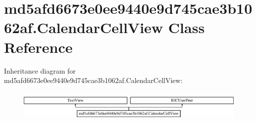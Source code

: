 \hypertarget{classmd5afd6673e0ee9440e9d745cae3b1062af_1_1CalendarCellView}{}\section{md5afd6673e0ee9440e9d745cae3b1062af.\+Calendar\+Cell\+View Class Reference}
\label{classmd5afd6673e0ee9440e9d745cae3b1062af_1_1CalendarCellView}
Inheritance diagram for md5afd6673e0ee9440e9d745cae3b1062af.\+Calendar\+Cell\+View\+:\begin{figure}[H]
\begin{center}
\leavevmode
\includegraphics[height=1.525886cm]{classmd5afd6673e0ee9440e9d745cae3b1062af_1_1CalendarCellView}
\end{center}
\end{figure}
